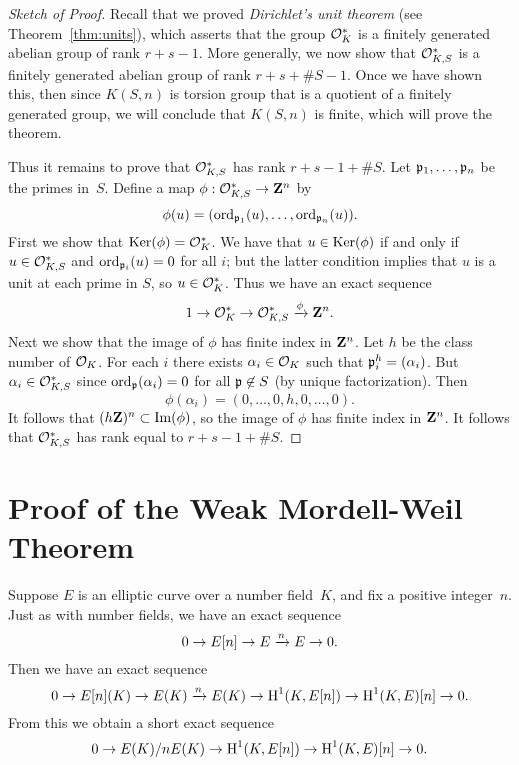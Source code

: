 \begin{proof}[Sketch of Proof]
Recall that we proved {\em Dirichlet's unit theorem} (see
Theorem~\ref{thm:units}), which asserts that the group $\mathcal{O}_K^*$ is a
finitely generated abelian group of rank $r+s-1$.  More generally, we
now show that $\mathcal{O}_{K,S}^*$ is a finitely generated abelian group of
rank $r+s+\#S -1$.  Once we have shown this, then since $K(S,n)$ is torsion
group that is a quotient of a finitely generated group, we will conclude
that $K(S,n)$ is finite, 
which will prove the theorem.

Thus it remains to prove that $\mathcal{O}_{K,S}^*$ has rank $r+s-1 + \#S$.
Let 
$\mathfrak{p}_1,\ldots, \mathfrak{p}_n$ be the primes in~$S$.
Define a map $\phi: \mathcal{O}_{K,S}^* \to \mathbf{Z}^n$ by 
$$
  \phi(u) = (\operatorname{ord}_{\mathfrak{p}_1}(u), \ldots, \operatorname{ord}_{\mathfrak{p}_n}(u)).
$$
First we show that $\operatorname{Ker}(\phi) = \mathcal{O}_K^*$.  We have that
$u\in \operatorname{Ker}(\phi)$ if and only if $u \in \mathcal{O}_{K,S}^*$
and $\operatorname{ord}_{\mathfrak{p}_i}(u) = 0$ for all $i$; but the latter condition
implies that $u$ is a unit at each prime in $S$, so $u\in \mathcal{O}_K^*$.
Thus we have an exact sequence
$$
  1 \to \mathcal{O}_K^* \to \mathcal{O}_{K,S}^* \xrightarrow{\phi} \mathbf{Z}^n.
$$
Next we show that the image of $\phi$ has finite index
in $\mathbf{Z}^n$.  Let $h$ be the class number of $\mathcal{O}_K$.
For each $i$ there exists $\alpha_i \in \mathcal{O}_K$
such that $\mathfrak{p}_i^h = (\alpha_i)$.  But $\alpha_i \in \mathcal{O}_{K,S}^*$
since $\operatorname{ord}_{\mathfrak{p}}(\alpha_i) = 0$ for all $\mathfrak{p}\not\in S$ (by unique
factorization).  Then 
$$
  \phi(\alpha_i) = (0,\ldots, 0, h, 0,\ldots, 0).
$$
It follows that $(h\mathbf{Z})^n \subset \text{Im}(\phi)$, so 
the image of $\phi$ has finite index in $\mathbf{Z}^n$.  It follows
that $\mathcal{O}_{K,S}^*$ has rank equal to $r+s-1+\#S$.
\end{proof}


\section{Proof of the Weak Mordell-Weil Theorem}
Suppose $E$ is an elliptic curve over a number field~$K$, and 
fix a positive integer~$n$.
Just as with number fields, we have an exact sequence 
$$
  0 \to E[n] \to E \xrightarrow{n} E \to 0.
$$
Then we have an exact sequence
$$
  0 \to E[n](K) \to E(K) \xrightarrow{n} E(K) \to \operatorname{H}^1(K,E[n]) \to \operatorname{H}^1(K,E)[n] \to 0.
$$
From this we obtain a short exact sequence
\begin{equation}\label{eqn:ke1}
  0 \to E(K)/n E(K) \to \operatorname{H}^1(K,E[n]) \to \operatorname{H}^1(K,E)[n] \to 0.
\end{equation}

